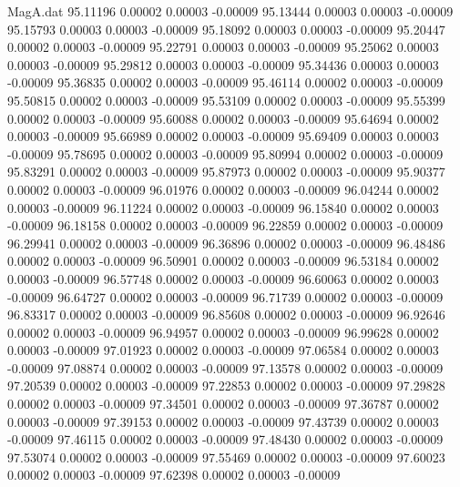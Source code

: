 \begin{filecontents}{MagA.dat}
  95.11196    0.00002    0.00003   -0.00009
  95.13444    0.00003    0.00003   -0.00009
  95.15793    0.00003    0.00003   -0.00009
  95.18092    0.00003    0.00003   -0.00009
  95.20447    0.00002    0.00003   -0.00009
  95.22791    0.00003    0.00003   -0.00009
  95.25062    0.00003    0.00003   -0.00009
  95.29812    0.00003    0.00003   -0.00009
  95.34436    0.00003    0.00003   -0.00009
  95.36835    0.00002    0.00003   -0.00009
  95.46114    0.00002    0.00003   -0.00009
  95.50815    0.00002    0.00003   -0.00009
  95.53109    0.00002    0.00003   -0.00009
  95.55399    0.00002    0.00003   -0.00009
  95.60088    0.00002    0.00003   -0.00009
  95.64694    0.00002    0.00003   -0.00009
  95.66989    0.00002    0.00003   -0.00009
  95.69409    0.00003    0.00003   -0.00009
  95.78695    0.00002    0.00003   -0.00009
  95.80994    0.00002    0.00003   -0.00009
  95.83291    0.00002    0.00003   -0.00009
  95.87973    0.00002    0.00003   -0.00009
  95.90377    0.00002    0.00003   -0.00009
  96.01976    0.00002    0.00003   -0.00009
  96.04244    0.00002    0.00003   -0.00009
  96.11224    0.00002    0.00003   -0.00009
  96.15840    0.00002    0.00003   -0.00009
  96.18158    0.00002    0.00003   -0.00009
  96.22859    0.00002    0.00003   -0.00009
  96.29941    0.00002    0.00003   -0.00009
  96.36896    0.00002    0.00003   -0.00009
  96.48486    0.00002    0.00003   -0.00009
  96.50901    0.00002    0.00003   -0.00009
  96.53184    0.00002    0.00003   -0.00009
  96.57748    0.00002    0.00003   -0.00009
  96.60063    0.00002    0.00003   -0.00009
  96.64727    0.00002    0.00003   -0.00009
  96.71739    0.00002    0.00003   -0.00009
  96.83317    0.00002    0.00003   -0.00009
  96.85608    0.00002    0.00003   -0.00009
  96.92646    0.00002    0.00003   -0.00009
  96.94957    0.00002    0.00003   -0.00009
  96.99628    0.00002    0.00003   -0.00009
  97.01923    0.00002    0.00003   -0.00009
  97.06584    0.00002    0.00003   -0.00009
  97.08874    0.00002    0.00003   -0.00009
  97.13578    0.00002    0.00003   -0.00009
  97.20539    0.00002    0.00003   -0.00009
  97.22853    0.00002    0.00003   -0.00009
  97.29828    0.00002    0.00003   -0.00009
  97.34501    0.00002    0.00003   -0.00009
  97.36787    0.00002    0.00003   -0.00009
  97.39153    0.00002    0.00003   -0.00009
  97.43739    0.00002    0.00003   -0.00009
  97.46115    0.00002    0.00003   -0.00009
  97.48430    0.00002    0.00003   -0.00009
  97.53074    0.00002    0.00003   -0.00009
  97.55469    0.00002    0.00003   -0.00009
  97.60023    0.00002    0.00003   -0.00009
  97.62398    0.00002    0.00003   -0.00009

\end{filecontents}
